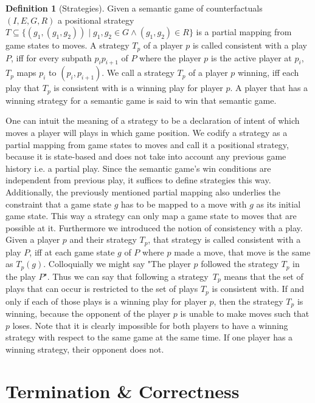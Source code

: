 \documentclass[a4paper,american,10pt]{paper}
\theoremstyle{definition}\newtheorem{definition}{Definition}
\begin{document}
\begin{definition}[Strategies]
Given a semantic game of counterfactuals $(I, E, G, R)$ a positional strategy $T\subseteq\{(g_1,(g_1,g_2))\mid g_1,g_2\in G\wedge (g_1,g_2)\in R\}$ is a partial mapping from game states to moves. A strategy $T_p$ of a player $p$ is called consistent with a play $P$, iff for every subpath $p_ip_{i+1}$ of $P$ where the player $p$ is the active player at $p_i$, $T_p$ maps $p_i$ to $(p_i,p_{i+1})$. We call a strategy $T_p$ of a player $p$ winning, iff each play that $T_p$ is consistent with is a winning play for player $p$. A player that has a winning strategy for a semantic game is said to win that semantic game.
\end{definition}
One can intuit the meaning of a strategy to be a declaration of intent of which moves a player will plays in which game position. We codify a strategy as a partial mapping from game states to moves and call it a positional strategy, because it is state-based and does not take into account any previous game history i.e. a partial play. Since the semantic game's win conditions are independent from previous play, it suffices to define strategies this way. Additionally, the previously mentioned partial mapping also underlies the constraint that a game state $g$ has to be mapped to a move with $g$ as its initial game state. This way a strategy can only map a game state to moves that are possible at it. Furthermore we introduced the notion of consistency with a play. Given a player $p$ and their strategy $T_p$, that strategy is called consistent with a play $P$, iff at each game state $g$ of $P$ where $p$ made a move, that move is the same as $T_p(g)$. Colloquially we might say "The player $p$ followed the strategy $T_p$ in the play $P$". Thus we can say that following a strategy~$T_p$ means that the set of plays that can occur is restricted to the set of plays $T_p$ is consistent with. If and only if each of those plays is a winning play for player $p$, then the strategy $T_p$ is winning, because the opponent of the player $p$ is unable to make moves such that $p$ loses. Note that it is clearly impossible for both players to have a winning strategy with respect to the same game at the same time. If one player has a winning strategy, their opponent does not.
\section{Termination \& Correctness}
\end{document}
